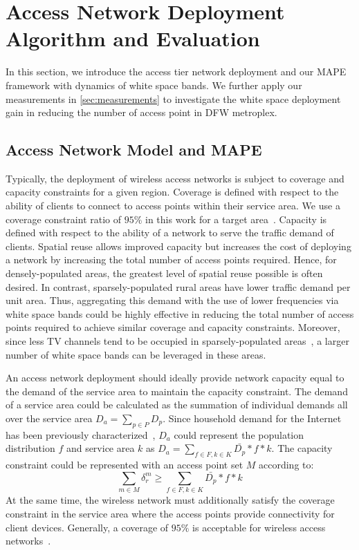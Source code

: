 \section{Access Network Deployment Algorithm and Evaluation}
\label{sec:winmee}

In this section, we introduce the access tier network deployment and our MAPE framework with dynamics 
of white space bands. We further apply our measurements in \ref{sec:measurements} to investigate the 
white space deployment gain in reducing the number of access point in DFW metroplex.

\subsection{Access Network Model and MAPE} 
\label{subsec:winmeemodel}

Typically, the deployment of wireless access networks is subject to coverage and capacity constraints 
for a given region. Coverage is defined with respect to the ability of clients to connect to access 
points within their service area.  We use a coverage constraint ratio of $95\%$ in this work for a 
target area~\cite{robinson2010deploying}. Capacity is defined with respect to the ability of a network 
to serve the traffic demand of clients. Spatial reuse allows improved capacity but increases the cost
of deploying a network by increasing the total number of access points required. Hence, for densely-populated 
areas, the greatest level of spatial reuse possible is often desired. In contrast, sparsely-populated 
rural areas have lower traffic demand per unit area.  Thus, aggregating this demand with the use of lower 
frequencies via white space bands could be highly effective in reducing the total number of access points 
required to achieve similar coverage and capacity constraints.  Moreover, since less TV channels tend to 
be occupied in sparsely-populated areas~\cite{msdatabase}, a larger number of white space bands can be 
leveraged in these areas.

An access network deployment should ideally provide network capacity equal to the demand of the service 
area to maintain the capacity constraint. The demand of a service area could be calculated as the 
summation of individual demands all over the service area $D_a=\sum_{p\in P}D_p$. Since household demand 
for the Internet has been previously characterized~\cite{rosston2011household}, $D_a$ could represent the 
population distribution $f$ and service area $k$ as $D_a=\sum_{f \in F,k \in K}\bar{D_p}*f*k$. The capacity 
constraint could be represented with an access point set $M$ according to:
\begin{equation}
\label{eq:nlbound}
\sum_{m \in M}\delta_r^m \ge \sum_{f \in F,k \in K}\bar{D_p}*f*k
\end{equation}
At the same time, the wireless network must additionally satisfy the coverage constraint in the service 
area where the access points provide connectivity for client devices. Generally, a coverage of $95\%$ is 
acceptable for wireless access networks~\cite{robinson2010deploying}.

